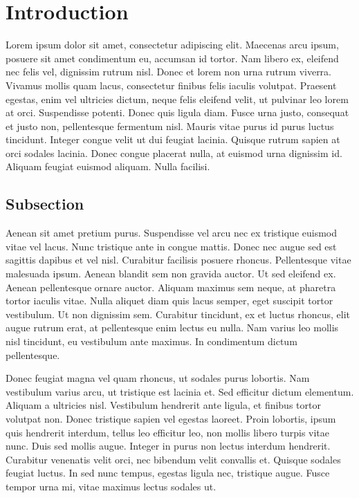 
\chapter*{Introduction}

Lorem ipsum dolor sit amet, consectetur adipiscing elit. Maecenas arcu ipsum, posuere sit amet condimentum eu, accumsan id tortor. Nam libero ex, eleifend nec felis vel, dignissim rutrum nisl. Donec et lorem non urna rutrum viverra. Vivamus mollis quam lacus, consectetur finibus felis iaculis volutpat. Praesent egestas, enim vel ultricies dictum, neque felis eleifend velit, ut pulvinar leo lorem at orci. Suspendisse potenti. Donec quis ligula diam. Fusce urna justo, consequat et justo non, pellentesque fermentum nisl. Mauris vitae purus id purus luctus tincidunt. Integer congue velit ut dui feugiat lacinia. Quisque rutrum sapien at orci sodales lacinia. Donec congue placerat nulla, at euismod urna dignissim id. Aliquam feugiat euismod aliquam. Nulla facilisi.

\section*{Subsection}
Aenean sit amet pretium purus. Suspendisse vel arcu nec ex tristique euismod vitae vel lacus. Nunc tristique ante in congue mattis. Donec nec augue sed est sagittis dapibus et vel nisl. Curabitur facilisis posuere rhoncus. Pellentesque vitae malesuada ipsum. Aenean blandit sem non gravida auctor. Ut sed eleifend ex. Aenean pellentesque ornare auctor. Aliquam maximus sem neque, at pharetra tortor iaculis vitae. Nulla aliquet diam quis lacus semper, eget suscipit tortor vestibulum. Ut non dignissim sem. Curabitur tincidunt, ex et luctus rhoncus, elit augue rutrum erat, at pellentesque enim lectus eu nulla. Nam varius leo mollis nisl tincidunt, eu vestibulum ante maximus. In condimentum dictum pellentesque.

Donec feugiat magna vel quam rhoncus, ut sodales purus lobortis. Nam vestibulum varius arcu, ut tristique est lacinia et. Sed efficitur dictum elementum. Aliquam a ultricies nisl. Vestibulum hendrerit ante ligula, et finibus tortor volutpat non. Donec tristique sapien vel egestas laoreet. Proin lobortis, ipsum quis hendrerit interdum, tellus leo efficitur leo, non mollis libero turpis vitae nunc. Duis sed mollis augue. Integer in purus non lectus interdum hendrerit. Curabitur venenatis velit orci, nec bibendum velit convallis et. Quisque sodales feugiat luctus. In sed nunc tempus, egestas ligula nec, tristique augue. Fusce tempor urna mi, vitae maximus lectus sodales ut.

